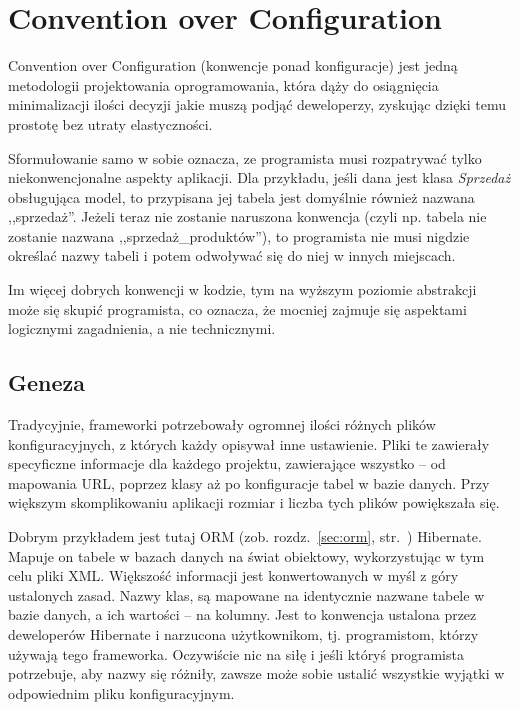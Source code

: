 \documentclass[a4paper,12pt,oneside]{report}
\begin{document}
\section{Convention over Configuration}
\label{sec:coc}
Convention over Configuration (konwencje ponad konfiguracje) jest jedną metodologii projektowania oprogramowania, która dąży do osiągnięcia minimalizacji ilości decyzji jakie muszą podjąć deweloperzy, zyskując dzięki temu prostotę bez utraty elastyczności.

Sformułowanie samo w sobie oznacza, ze programista musi rozpatrywać tylko niekonwencjonalne aspekty aplikacji. Dla przykładu, jeśli dana jest klasa \emph{Sprzedaż} obsługująca model, to przypisana jej tabela jest domyślnie również nazwana ,,sprzedaż''. Jeżeli teraz nie zostanie naruszona konwencja (czyli np. tabela nie zostanie nazwana ,,sprzedaż\_produktów''), to programista nie musi nigdzie określać nazwy tabeli i potem odwoływać się do niej w innych miejscach.

Im więcej dobrych konwencji w kodzie, tym na wyższym poziomie abstrakcji może się skupić programista, co oznacza, że mocniej zajmuje się aspektami logicznymi zagadnienia, a nie technicznymi.

\subsection{Geneza}
\label{sub:geneza}
Tradycyjnie, frameworki potrzebowały ogromnej ilości różnych plików konfiguracyjnych, z których każdy opisywał inne ustawienie. Pliki te zawierały specyficzne informacje dla każdego projektu, zawierające wszystko -- od mapowania URL, poprzez klasy aż po konfiguracje tabel w bazie danych. Przy większym skomplikowaniu aplikacji rozmiar i liczba tych plików powiększała się.

Dobrym przykładem jest tutaj ORM (zob. rozdz.~\ref{sec:orm}, str.~\pageref{sec:orm}) Hibernate. Mapuje on tabele w bazach danych na świat obiektowy, wykorzystując w tym celu pliki XML. Większość informacji jest konwertowanych w myśl z góry ustalonych zasad. Nazwy klas, są mapowane na identycznie nazwane tabele w bazie danych, a ich wartości -- na kolumny. Jest to konwencja ustalona przez deweloperów Hibernate i narzucona użytkownikom, tj. programistom, którzy używają tego frameworka. Oczywiście nic na siłę i jeśli któryś programista potrzebuje, aby nazwy się różniły, zawsze może sobie ustalić wszystkie wyjątki w odpowiednim pliku konfiguracyjnym.
\end{document}
